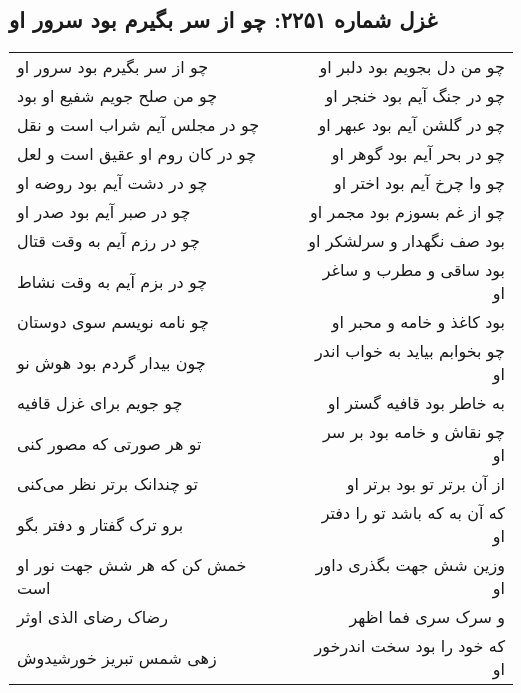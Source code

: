 \begin{center}
\section*{غزل شماره ۲۲۵۱: چو از سر بگیرم بود سرور او}
\label{sec:2251}
\begin{longtable}{l p{0.5cm} r}
چو از سر بگیرم بود سرور او
&&
چو من دل بجویم بود دلبر او
\\
چو من صلح جویم شفیع او بود
&&
چو در جنگ آیم بود خنجر او
\\
چو در مجلس آیم شراب است و نقل
&&
چو در گلشن آیم بود عبهر او
\\
چو در کان روم او عقیق است و لعل
&&
چو در بحر آیم بود گوهر او
\\
چو در دشت آیم بود روضه او
&&
چو وا چرخ آیم بود اختر او
\\
چو در صبر آیم بود صدر او
&&
چو از غم بسوزم بود مجمر او
\\
چو در رزم آیم به وقت قتال
&&
بود صف نگهدار و سرلشکر او
\\
چو در بزم آیم به وقت نشاط
&&
بود ساقی و مطرب و ساغر او
\\
چو نامه نویسم سوی دوستان
&&
بود کاغذ و خامه و محبر او
\\
چون بیدار گردم بود هوش نو
&&
چو بخوابم بیاید به خواب اندر او
\\
چو جویم برای غزل قافیه
&&
به خاطر بود قافیه گستر او
\\
تو هر صورتی که مصور کنی
&&
چو نقاش و خامه بود بر سر او
\\
تو چندانک برتر نظر می‌کنی
&&
از آن برتر تو بود برتر او
\\
برو ترک گفتار و دفتر بگو
&&
که آن به که باشد تو را دفتر او
\\
خمش کن که هر شش جهت نور او است
&&
وزین شش جهت بگذری داور او
\\
رضاک رضای الذی اوثر
&&
و سرک سری فما اظهر
\\
زهی شمس تبریز خورشیدوش
&&
که خود را بود سخت اندرخور او
\\
\end{longtable}
\end{center}
